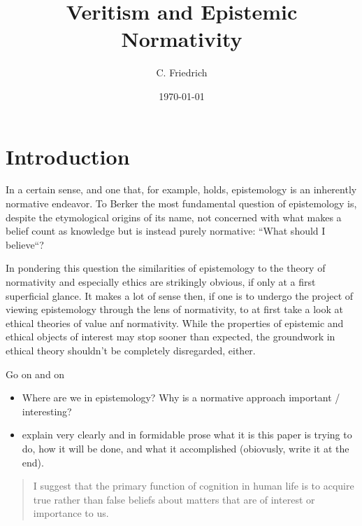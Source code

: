 \documentclass[12pt,numbers=noenddot]{scrartcl}
\title{Veritism and Epistemic Normativity}
\author{C. Friedrich}
\date{\today}
\begin{document}
\begin{titlepage}
\maketitle


\thispagestyle{empty}
\end{titlepage}

\tableofcontents
\newpage

\section{Introduction}

In a certain sense, and one that, for example, \textcite{Berker2013-BERETA-2} holds, epistemology is an inherently normative endeavor. To Berker the most fundamental question of epistemology is, despite the etymological origins of its name, not concerned with what makes a belief count as knowledge but is instead purely normative: “What should I believe“?

In pondering this question the similarities of epistemology to the theory of normativity and especially ethics are strikingly obvious, if only at a first superficial glance. It makes a lot of sense then, if one is to undergo the project of viewing epistemology through the lens of normativity, to at first take a look at ethical theories of value anf normativity. While the properties of epistemic and ethical objects of interest may stop sooner than expected, the groundwork in ethical theory shouldn't be completely disregarded, either.

Go on and on
\begin{itemize}
    \item Where are we in epistemology? Why is a normative approach important / interesting?
    \item explain very clearly and in formidable prose what it is this paper is trying to do, how it will be done, and what it accomplished (obiovusly, write it at the end).
\end{itemize}

\begin{quote}
 I suggest that the primary function of cognition in human life is to acquire true rather than false beliefs about matters that are of interest or importance to us. \parencite[29]{Alston2005-ALSBJD}
\end{quote}
\end{document}
